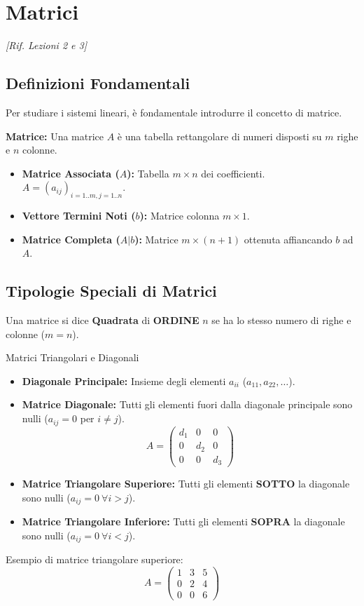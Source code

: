 \section{Matrici}
\emph{[Rif. Lezioni 2 e 3]}

\subsection{Definizioni Fondamentali}
Per studiare i sistemi lineari, è fondamentale introdurre il concetto di matrice.

\begin{definitionbox}
\textbf{Matrice:} Una matrice $A$ è una tabella rettangolare di numeri disposti su $m$ righe e $n$ colonne.
\begin{itemize}
    \item \textbf{Matrice Associata ($A$):} Tabella $m \times n$ dei coefficienti. $A = (a_{ij})_{i=1..m, j=1..n}$.
    \item \textbf{Vettore Termini Noti ($b$):} Matrice colonna $m \times 1$.
    \item \textbf{Matrice Completa ($A|b$):} Matrice $m \times (n+1)$ ottenuta affiancando $b$ ad $A$.
\end{itemize}
\end{definitionbox}

\subsection{Tipologie Speciali di Matrici}
Una matrice si dice \textbf{Quadrata} di \textbf{ORDINE} $n$ se ha lo stesso numero di righe e colonne ($m=n$).

\begin{concept}{Matrici Triangolari e Diagonali}
\begin{itemize}
    \item \textbf{Diagonale Principale:} Insieme degli elementi $a_{ii}$ ($a_{11}, a_{22}, \dots$).
    \item \textbf{Matrice Diagonale:} Tutti gli elementi fuori dalla diagonale principale sono nulli ($a_{ij} = 0$ per $i \neq j$).
    $$ A = \begin{pmatrix} d_1 & 0 & 0 \\ 0 & d_2 & 0 \\ 0 & 0 & d_3 \end{pmatrix} $$
    \item \textbf{Matrice Triangolare Superiore:} Tutti gli elementi \textbf{SOTTO} la diagonale sono nulli ($a_{ij}=0 \ \forall i > j$).
    \item \textbf{Matrice Triangolare Inferiore:} Tutti gli elementi \textbf{SOPRA} la diagonale sono nulli ($a_{ij}=0 \ \forall i < j$).
\end{itemize}
\end{concept}

\begin{example}
Esempio di matrice triangolare superiore:
$$ A = \begin{pmatrix} 1 & 3 & 5 \\ 0 & 2 & 4 \\ 0 & 0 & 6 \end{pmatrix} $$
\end{example}
